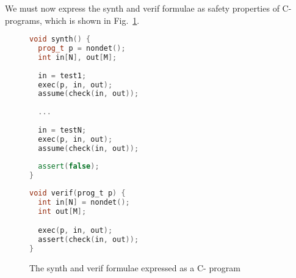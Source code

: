 \documentclass[a4paper]{llncs}
\begin{document}
We must now express the {\sc synth} and {\sc verif} formulae as safety properties
of C- programs, which is shown in Fig.~\ref{fig:c-synthverif}.

\begin{figure}
\centering
\begin{minipage}{0.45\textwidth}
\begin{lstlisting}[language=C++]
void synth() {
  prog_t p = nondet();
  int in[N], out[M];
  
  in = test1;
  exec(p, in, out);
  assume(check(in, out));
  
  ...
  
  in = testN;
  exec(p, in, out);
  assume(check(in, out));
  
  assert(false);
}
\end{lstlisting}
\end{minipage}
\begin{minipage}{0.45\textwidth}
\begin{lstlisting}[language=C]
void verif(prog_t p) {
  int in[N] = nondet();
  int out[M];

  exec(p, in, out);
  assert(check(in, out));
}
\end{lstlisting}
\end{minipage}

 \label{fig:c-synthverif}
 \caption{The {\sc synth} and {\sc verif} formulae expressed as a C- program}
\end{figure}
\end{document}
